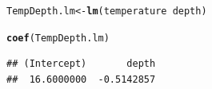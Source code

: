 \documentclass{tufte-handout}\usepackage[]{graphicx}\usepackage[]{xcolor}
\makeatletter
\newcommand{\hlopt}[1]{\textcolor[rgb]{0,0,0}{#1}}%
\newcommand{\hlstd}[1]{\textcolor[rgb]{0.345,0.345,0.345}{#1}}%
\newcommand{\hlkwb}[1]{\textcolor[rgb]{0.69,0.353,0.396}{#1}}%
\newcommand{\hlkwd}[1]{\textcolor[rgb]{0.737,0.353,0.396}{\textbf{#1}}}%
\newenvironment{kframe}{%
 \def\at@end@of@kframe{}%
 \ifinner\ifhmode%
  \def\at@end@of@kframe{\end{minipage}}%
  \begin{minipage}{\columnwidth}%
 \fi\fi%
 \def\FrameCommand##1{\hskip\@totalleftmargin \hskip-\fboxsep
 \colorbox{shadecolor}{##1}\hskip-\fboxsep
     \hskip-\linewidth \hskip-\@totalleftmargin \hskip\columnwidth}%
 \MakeFramed {\advance\hsize-\width
   \@totalleftmargin\z@ \linewidth\hsize
   \@setminipage}}%
 {\par\unskip\endMakeFramed%
 \at@end@of@kframe}
\newenvironment{knitrout}{}{} %
\makeatother
\begin{document}
\begin{knitrout}
\color{fgcolor}\begin{kframe}
\begin{alltt}
\hlstd{TempDepth.lm} \hlkwb{<-} \hlkwd{lm}\hlstd{(temperature} \hlopt{~} \hlstd{depth)}

\hlkwd{coef}\hlstd{(TempDepth.lm)}
\end{alltt}
\begin{verbatim}
## (Intercept)       depth 
##  16.6000000  -0.5142857
\end{verbatim}
\end{kframe}
\end{knitrout}
\end{document}
